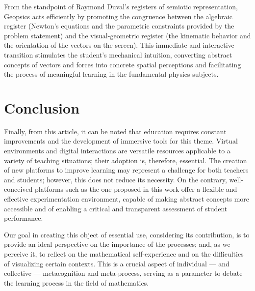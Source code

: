 \documentclass[conference,a4paper]{IEEEtran}
\begin{document}
From the standpoint of Raymond Duval's registers of semiotic representation, Geopsics acts efficiently by promoting the congruence between the algebraic register (Newton's equations and the parametric constraints provided by the problem statement) and the visual-geometric register (the kinematic behavior and the orientation of the vectors on the screen). This immediate and interactive transition stimulates the student's mechanical intuition, converting abstract concepts of vectors and forces into concrete spatial perceptions and facilitating the process of meaningful learning in the fundamental physics subjects.

\section{Conclusion}

Finally, from this article, it can be noted that education requires constant improvements and the development of immersive tools for this theme. Virtual environments and digital interactions are versatile resources applicable to a variety of teaching situations; their adoption is, therefore, essential. The creation of new platforms to improve learning may represent a challenge for both teachers and students; however, this does not reduce its necessity. On the contrary, well-conceived platforms such as the one proposed in this work offer a flexible and effective experimentation environment, capable of making abstract concepts more accessible and of enabling a critical and transparent assessment of student performance.

Our goal in creating this object of essential use, considering its contribution, is to provide an ideal perspective on the importance of the processes; and, as we perceive it, to reflect on the mathematical self-experience and on the difficulties of visualizing certain contexts. This is a crucial aspect of individual --- and collective --- metacognition and meta-process, serving as a parameter to debate the learning process in the field of mathematics.
\end{document}

